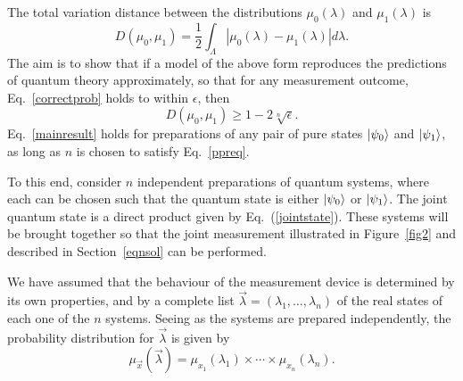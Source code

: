 \documentclass[amsmath,amssymb,superscriptaddress,pra,12pt]{revtex4-1}
\newcommand{\abs}[1]{\left\lvert{#1}\right\rvert}
\begin{document}
The total variation distance between the distributions $\mu_0(\lambda)$ and $\mu_1(\lambda)$ is
\[
D(\mu_0,\mu_1) = \frac12\int_\Lambda \abs{\mu_0(\lambda) - \mu_1(\lambda)}d\lambda.
\]
The aim is to show that if a model of the above form reproduces the predictions of quantum theory approximately, so that for any measurement outcome, Eq.~\eqref{correctprob} holds to within $\epsilon$, then
\begin{equation}\label{mainresult}
  D(\mu_0,\mu_1) \geq 1 - 2\sqrt[n]{\epsilon}.
\end{equation} 
Eq.~\eqref{mainresult} holds for preparations of any pair of pure states $\ket{\psi_0}$ and $\ket{\psi_1}$, as long as $n$ is chosen to satisfy Eq.~\eqref{ppreq}.

To this end, consider $n$ independent preparations of quantum systems, where each can be chosen such that the quantum state is either $\ket{\psi_0}$ or $\ket{\psi_1}$. The joint quantum state is a direct product given by Eq.~(\ref{jointstate}). These systems will be brought together so that the joint measurement illustrated in Figure~\ref{fig2} and described in Section~\ref{eqnsol} can be performed. 

We have assumed that the behaviour of the measurement device is determined by its own properties, and by a complete list $\vec{\lambda} = (\lambda_1,\ldots,\lambda_n)$ of the real states of each one of the $n$ systems. Seeing as the systems are prepared independently, the probability distribution for $\vec{\lambda}$ is given by
\begin{equation}\label{productass}
\mu_{\vec{x}}(\vec{\lambda}) = \mu_{x_1}(\lambda_1)\times\cdots\times \mu_{x_n}(\lambda_n).
\end{equation}
\end{document}
